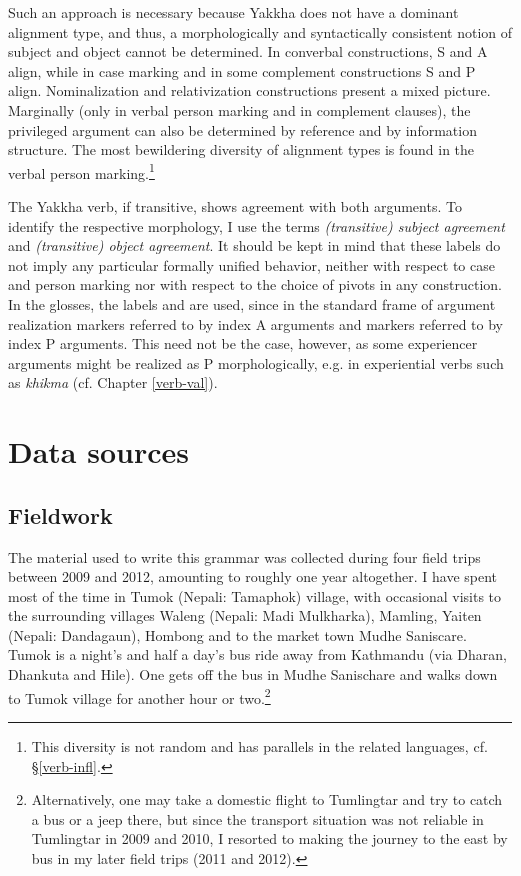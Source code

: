 Such an approach is necessary because Yakkha does not have a dominant alignment type, and thus, a morphologically and syntactically consistent notion of subject and object cannot be determined. In converbal constructions, S and A align, while in case marking and in some complement constructions S and P align. Nominalization and relativization constructions present a mixed picture. Marginally (only in verbal person marking and in complement clauses), the  privileged argument can also be determined by reference and by information structure. The most bewildering diversity of alignment types is found in the verbal person marking.\footnote{This diversity is not random and has parallels in the related languages, cf. §\ref{verb-infl}.}   


The Yakkha verb, if transitive, shows agreement with both arguments. To identify the respective morphology, I use the terms \emph{(transitive) subject agreement}  and \emph{(transitive) object agreement}. It should be kept in mind that these labels do not imply any particular formally unified behavior, neither with respect to case and person marking nor with respect to the choice of pivots in any construction. In the glosses,  the labels  and  are used, since in the standard frame of argument realization markers referred to by  index A arguments and markers referred to by  index P arguments. This need not be the case, however, as some experiencer arguments might be realized as P morphologically, e.g. in experiential verbs such as \emph{khikma}  (cf. Chapter \ref{verb-val}).


\section{Data sources}\label{sources}

\subsection{Fieldwork}

The material used to write this grammar was collected during four field trips between 2009 and 2012, amounting to roughly one year altogether. I have spent most of the time in Tumok (Nepali: Tamaphok) village, with occasional visits to the surrounding villages Waleng (Nepali: Madi Mulkharka), Mamling, Yaiten (Nepali:  Dandagaun), Hombong and to the market town Mudhe Saniscare. Tumok is a night's and half a day's bus ride away from Kathmandu (via Dharan, Dhankuta and Hile). One gets off the bus in  Mudhe Sanischare and walks down to Tumok village for another hour or two.\footnote{Alternatively, one may take a domestic flight to Tumlingtar and try to catch a bus or a jeep there, but since the transport situation was not reliable in Tumlingtar in 2009 and 2010, I resorted to making the journey to the east by bus in my later field trips (2011 and 2012).}


